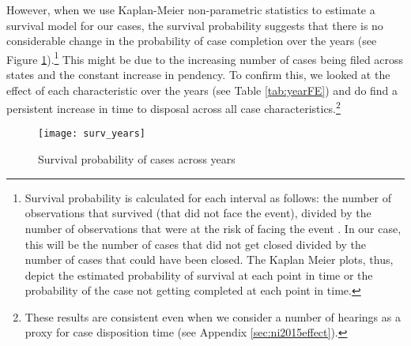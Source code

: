 \documentclass[12pt,a4paper]{article}
\begin{document}
	However, when we use Kaplan-Meier non-parametric statistics to estimate a survival model for our cases, the survival probability suggests that there is no considerable change in the probability of case completion over the years (see Figure \ref{fig:yearSurvival}).\footnote{Survival probability is calculated for each interval as follows: the number of observations that survived (that did not face the event), divided by the number of observations that were at the risk of facing the event \autocite{rich2010practical}. In our case, this will be the number of cases that did not get closed divided by the number of cases that could have been closed. The Kaplan Meier plots, thus, depict the estimated probability of survival at each point in time or the probability of the case not getting completed at each point in time.} This might be due to the increasing number of cases being filed across states and the constant increase in pendency. To confirm this, we looked at the effect of each characteristic over the years (see Table \ref{tab:yearFE}) and do find a persistent increase in time to disposal across all case characteristics.\footnote{These results are consistent even when we consider a number of hearings as a proxy for case disposition time (see Appendix \ref{sec:ni2015effect}).} 
	
	\begin{figure}[h]
		\centering
		\caption{Survival probability of cases across years}\label{fig:yearSurvival}
		\texttt{[image: surv\_years]}
	\end{figure}
	
\end{document}
